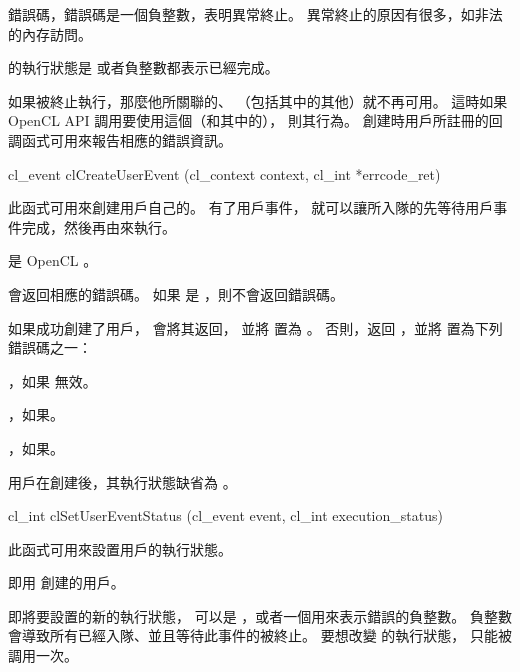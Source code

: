 \item 錯誤碼，錯誤碼是一個負整數，表明異常終止。
異常終止的原因有很多，如非法的內存訪問。
\stopigBase

\startnotepar
{}的執行狀態是  或者負整數都表示已經完成。
\stopnotepar

如果被終止執行，那麼他所關聯的、
（包括其中的其他）就不再可用。
這時如果 OpenCL API 調用要使用這個（和其中的），
則其行為。
創建時用戶所註冊的回調函式可用來報告相應的錯誤資訊。


\startCLFUNC
cl_event clCreateUserEvent (cl_context context,
		cl_int *errcode_ret)
\stopCLFUNC

此函式可用來創建用戶自己的。
有了用戶事件，
就可以讓所入隊的先等待用戶事件完成，然後再由來執行。

 是 OpenCL 。

 會返回相應的錯誤碼。
如果  是 ，則不會返回錯誤碼。

如果成功創建了用戶，  會將其返回，
並將  置為 。
否則，返回 ，並將  置為下列錯誤碼之一：
\startigBase
\item {}，如果  無效。

\item {}，如果\scdevfailres。

\item {}，如果\schostfailres。
\stopigBase

用戶在創建後，其執行狀態缺省為 。


\startCLFUNC
cl_int clSetUserEventStatus (cl_event event,
		cl_int execution_status)
\stopCLFUNC

此函式可用來設置用戶的執行狀態。

 即用  創建的用戶。

 即將要設置的新的執行狀態，
可以是 ，或者一個用來表示錯誤的負整數。
負整數會導致所有已經入隊、並且等待此事件的被終止。
要想改變  的執行狀態，  只能被調用一次。

